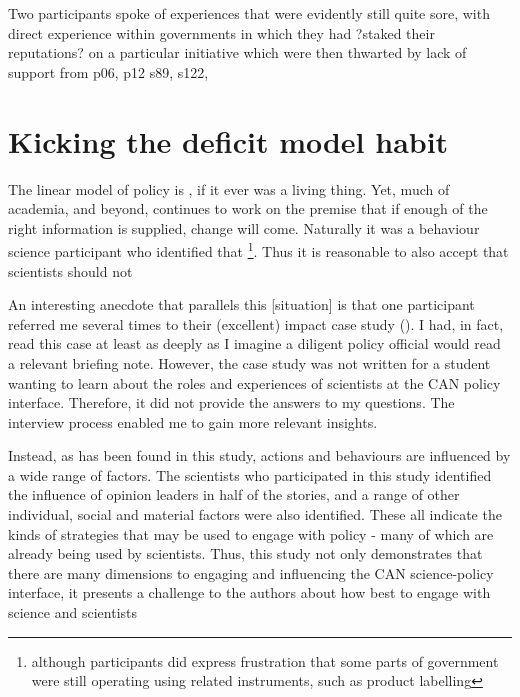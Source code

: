 Two participants spoke of experiences that were evidently still quite sore, with direct experience within governments in which they had ?staked their reputations? on a particular initiative which were then thwarted by lack of support from p06, p12 s89, s122, 

\section{Kicking the deficit model habit}\label{sec:disdeficit}
The linear model of policy is , if it ever was a living thing. Yet, much of academia, and beyond, continues to work on the premise that if enough of the right information is supplied, change will come. Naturally it was a behaviour science participant who identified that \footnote{although participants did express frustration that some parts of government were still operating using related instruments, such as product labelling}. Thus it is reasonable to also accept that scientists should not 

An interesting anecdote that parallels this [situation] is that one participant referred me several times to their (excellent) impact case study (). I had, in fact, read this case at least as deeply as I imagine a diligent policy official would read a relevant briefing note. However, the case study was not written for a student wanting to learn about the roles and experiences of scientists at the CAN policy interface. Therefore, it did not provide the answers to my questions. The interview process enabled me to gain more relevant insights.

Instead, as has been found in this study, actions and behaviours are influenced by a wide range of factors. The scientists who participated in this study identified the influence of opinion leaders in half of the stories, and a range of other individual, social and material factors were also identified. These all indicate the kinds of strategies that may be used to engage with policy - many of which are already being used by scientists. Thus, this study not only demonstrates that there are many dimensions to engaging and influencing the CAN science-policy interface, it presents a challenge to the authors about how best to engage with science and scientists

